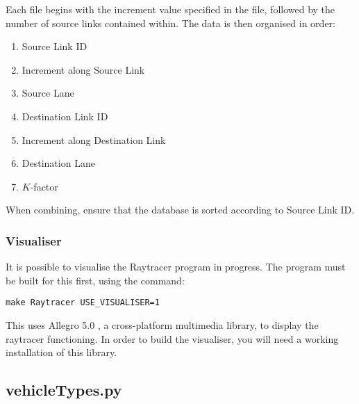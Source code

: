 Each file begins with the increment value specified in the file, followed by the number of source links contained within. The data is then organised in order:
\begin{enumerate}
 \item Source Link ID
 \item Increment along Source Link
 \item Source Lane
 \item Destination Link ID
 \item Increment along Destination Link
 \item Destination Lane
 \item $K$-factor
\end{enumerate}
When combining, ensure that the database is sorted according to Source Link ID.

\subsubsection{Visualiser} \label{subsubsect:visualise}
It is possible to visualise the Raytracer program in progress. The program must be built for this first, using the command:\begin{lstlisting}[frame=single]
 make Raytracer USE_VISUALISER=1
\end{lstlisting}
This uses Allegro 5.0 \cite{hargraves_allegro_2014}, a cross-platform multimedia library, to display the raytracer functioning. In order to build the visualiser, you will need a working installation of this library.

\subsection{vehicleTypes.py}

